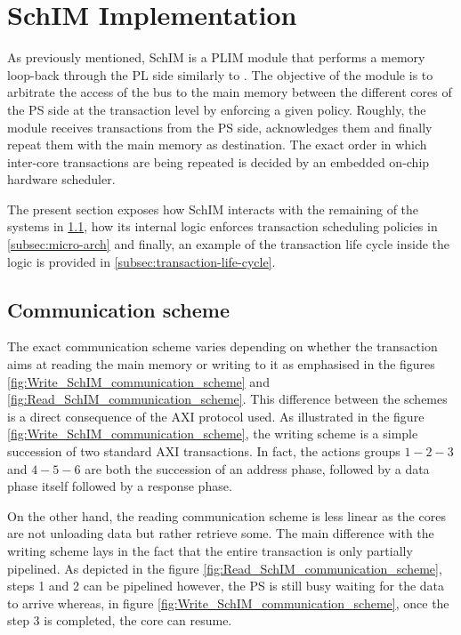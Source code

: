 \section{SchIM Implementation}
    As previously mentioned, SchIM is a PLIM module that performs a memory loop-back through the PL side similarly to \cite{PLIM20}.
    The objective of the module is to arbitrate the access of the bus to the main memory between the different cores of the PS side at the transaction level by enforcing a given policy.
    Roughly, the module receives transactions from the PS side, acknowledges them and finally repeat them with the main memory as destination.
    The exact order in which inter-core transactions are being repeated is decided by an embedded on-chip hardware scheduler.

    The present section exposes how SchIM interacts with the remaining of the systems in \ref{subsec:communication-scheme}, how its internal logic enforces transaction scheduling policies in \ref{subsec:micro-arch} and finally, an example of the transaction life cycle inside the logic is provided in \ref{subsec:transaction-life-cycle}.

    \subsection{Communication scheme}
        \label{subsec:communication-scheme}
        The exact communication scheme varies depending on whether the transaction aims at reading the main memory or writing to it as emphasised in the figures \ref{fig:Write_SchIM_communication_scheme} and \ref{fig:Read_SchIM_communication_scheme}.
        This difference between the schemes is a direct consequence of the AXI protocol \cite{ARM-AXI} used.
        As illustrated in the figure \ref{fig:Write_SchIM_communication_scheme}, the writing scheme is a simple succession of two standard AXI transactions. In fact, the actions groups $1-2-3$ and $4-5-6$ are both the succession of an address phase, followed by a data phase itself followed by a response phase.

        On the other hand, the reading communication scheme is less linear as the cores are not unloading data but rather retrieve some.
        The main difference with the writing scheme lays in the fact that the entire transaction is only partially pipelined.
        As depicted in the figure \ref{fig:Read_SchIM_communication_scheme}, steps 1 and 2 can be pipelined however, the PS is still busy waiting for the data to arrive whereas, in figure \ref{fig:Write_SchIM_communication_scheme}, once the step 3 is completed, the core can resume.

